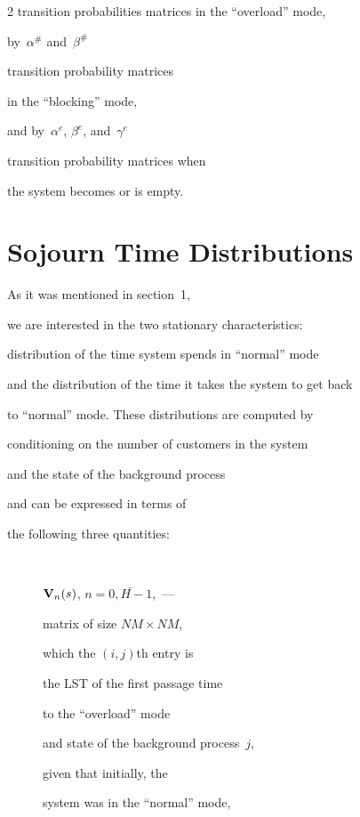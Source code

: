 \begin{multicols}{2}
transition probabilities matrices in the ``overload'' mode,


by~$\alpha^{\#}$ and~$\beta^{\#}$


transition probability matrices  


in the ``blocking'' mode,


and by~$\alpha^{e}$, $\beta^{e}$, and~$\gamma^{e}$


transition probability matrices when


the system becomes or is empty.








\section{Sojourn Time Distributions}





\noindent


As it was mentioned in section~1,


we are interested in the two stationary characteristics:


distribution of the time system spends in ``normal'' mode


and the distribution of the time it takes the  system to get back 


to ``normal'' mode. These distributions are computed by 


conditioning on the number of customers in the system


and the state of the background process


and can be expressed in terms of


the following three quantities:


\begin{description}


\item[\,] $\mathbf{V}_n(s)$, $n=\overline{0,H-1}$,~---


matrix of size $NM\times NM$,


which the $(i,j)${th} entry is


the LST of the first passage time 


to the ``overload'' mode 


and state of the background process~$j$, 


given that initially, the 


system was in the ``normal'' mode,



\end{description}
\end{multicols}
